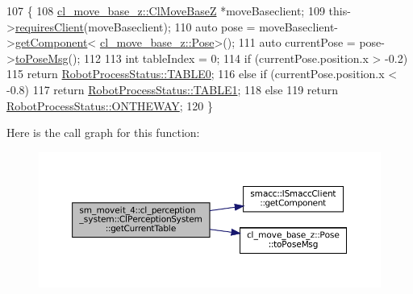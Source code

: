 \begin{DoxyCode}
107     \{
108         \hyperlink{classcl__move__base__z_1_1ClMoveBaseZ}{cl\_move\_base\_z::ClMoveBaseZ} *moveBaseclient;
109         this->\hyperlink{classsmacc_1_1ISmaccClient_a7a9990a2f3e35d547671188d69fee520}{requiresClient}(moveBaseclient);
110         \textcolor{keyword}{auto} pose = moveBaseclient->\hyperlink{classsmacc_1_1ISmaccClient_adef78db601749ca63c19e74a27cb88cc}{getComponent}<
      \hyperlink{classcl__move__base__z_1_1Pose}{cl\_move\_base\_z::Pose}>();
111         \textcolor{keyword}{auto} currentPose = pose->\hyperlink{classcl__move__base__z_1_1Pose_a9faf8c6b437ff6b19c8bddd692908dca}{toPoseMsg}();
112 
113         \textcolor{keywordtype}{int} tableIndex = 0;
114         \textcolor{keywordflow}{if} (currentPose.position.x > -0.2)
115             \textcolor{keywordflow}{return} \hyperlink{namespacesm__moveit__4_1_1cl__perception__system_a11dfa58fc66f2d368b894a9f1fec870ea1fd65c0ced0ead229bf6dd6a59067a4f}{RobotProcessStatus::TABLE0};
116         \textcolor{keywordflow}{else} \textcolor{keywordflow}{if} (currentPose.position.x < -0.8)
117             \textcolor{keywordflow}{return} \hyperlink{namespacesm__moveit__4_1_1cl__perception__system_a11dfa58fc66f2d368b894a9f1fec870ea5b22e42e5d94a94037a4486a4976c49d}{RobotProcessStatus::TABLE1};
118         \textcolor{keywordflow}{else}
119             \textcolor{keywordflow}{return} \hyperlink{namespacesm__moveit__4_1_1cl__perception__system_a11dfa58fc66f2d368b894a9f1fec870ea92f7ea3097b3fdb1b7a25669cfc1b8bd}{RobotProcessStatus::ONTHEWAY};
120     \}
\end{DoxyCode}
Here is the call graph for this function\+:
\nopagebreak
\begin{figure}[H]
\begin{center}
\leavevmode
\includegraphics[width=350pt]{classsm__moveit__4_1_1cl__perception__system_1_1ClPerceptionSystem_aa08e0d656ca31a618c0a4c496afe36af_cgraph}
\end{center}
\end{figure}
\mbox{\label{classsm__moveit__4_1_1cl__perception__system_1_1ClPerceptionSystem_adb892199c1e7eb48d41e501a2b0ec5e8}} 
